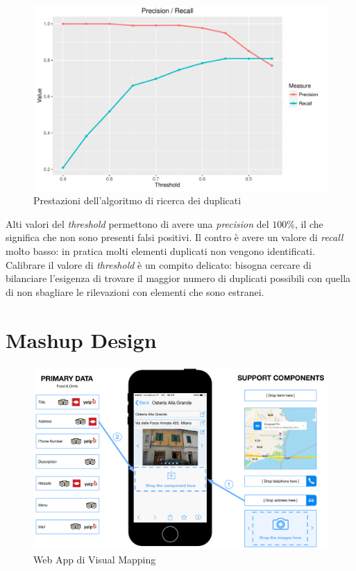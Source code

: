 \begin{figure}[ht]
	\centering
	\includegraphics[width=\textwidth]{3-metodologia-camus/Immagini/similarity_precision_recall.pdf}
	\caption{Prestazioni dell'algoritmo di ricerca dei duplicati}\label{fig:prestazioni-algoritmo-duplicati}
\end{figure}

Alti valori del \emph{threshold} permettono di avere una \emph{precision} del $ 100\% $, il che significa che non sono presenti falsi positivi. Il contro è avere un valore di \emph{recall} molto basso: in pratica molti elementi duplicati non vengono identificati. Calibrare il valore di \emph{threshold} è un compito delicato: bisogna cercare di bilanciare l'esigenza di trovare il maggior numero di duplicati possibili con quella di non sbagliare le rilevazioni con elementi che sono estranei.

\section{Mashup Design\label{sec:mashup-design}}

\begin{figure}[ht]
	\centering
	\includegraphics[width=\textwidth]{3-metodologia-camus/Immagini/visual_mapping_nuovo.pdf}
	\caption{Web App di Visual Mapping}\label{fig:visual-mapping}
\end{figure}

